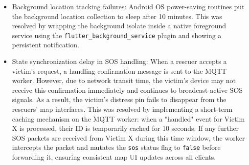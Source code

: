 \documentclass[../Main.tex]{subfiles}
\begin{document}
\begin{itemize}
    \item Background location tracking failures: Android OS power-saving routines put the background location collection to sleep after 10 minutes. This was resolved by wrapping the background isolate inside a native foreground service using the \texttt{flutter\_background\_service} plugin and showing a persistent notification.
    \item State synchronization delay in SOS handling: When a rescuer accepts a victim's request, a handling confirmation message is sent to the MQTT worker. However, due to network transit time, the victim's device may not receive this confirmation immediately and continues to broadcast active SOS signals. As a result, the victim's distress pin fails to disappear from the rescuers' map interfaces. This was resolved by implementing a short-term caching mechanism on the MQTT worker: when a "handled" event for Victim X is processed, their ID is temporarily cached for 10 seconds. If any further SOS packets are received from Victim X during this time window, the worker intercepts the packet and mutates the \texttt{sos} status flag to \texttt{false} before forwarding it, ensuring consistent map UI updates across all clients.
\end{itemize}
\end{document}

